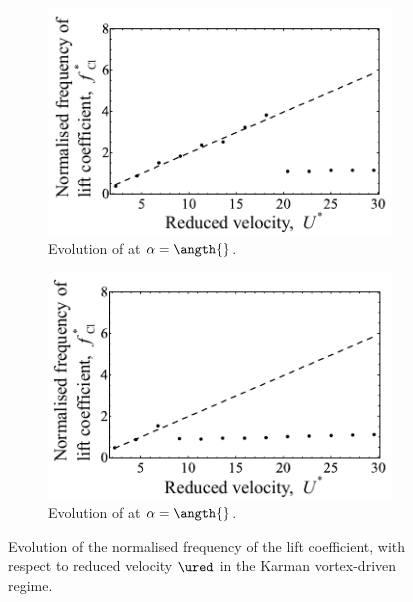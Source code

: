\documentclass[a4paper,fleqn]{cas-sc}
\begin{document}
\begin{figure}
  \centering
  \begin{subfigure}[h]{0.38\textwidth}
    \includegraphics[width=\textwidth]{figs/clFreq2}
    \caption{Evolution of at $\alpha = \angth{}$.}
    \label{fig:clFreq2}
  \end{subfigure}

  \begin{subfigure}[h]{0.38\textwidth}
    \includegraphics[width=\textwidth]{figs/clFreq1}
    \caption{Evolution of at $\alpha = \angth{}$.}
    \label{fig:clFreq1}
  \end{subfigure}

  \caption{Evolution of the normalised frequency of the lift coefficient,  with respect to reduced velocity $\ured$ in the Karman vortex-driven regime.} \label{fig:clFreqKarman}
\end{figure}
\end{document}
